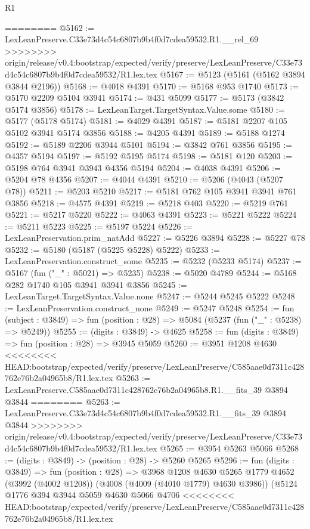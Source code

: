 \begin{lexlean}{R1}
\begin{coremodule}
{{{{{{{{{{{{{{{{{{{{{{{{{{{{{{{{{{{{{{{{{{{{{{{{{{{{{{{{{{{{{{{{{{{{{{{{{{{{{{{{{{{{{{{{{{{{{{{{{{{{{{{{{{{{{{{{{{{{{{{{{{{{{{{{{{{{{{{{{{{{{{{{{{{{{{{{{{{{{{{{{{{{{{{{{{{{{{{{{{{{{{{{{{========
@5162 := LexLeanPreserve.C33e73d4c54c6807b9b4f0d7cdea59532.R1.__rel_69
>>>>>>>> origin/release/v0.4:bootstrap/expected/verify/preserve/LexLeanPreserve/C33e73d4c54c6807b9b4f0d7cdea59532/R1.lex.tex
@5167 := @5123 (@5161 (@5162 @3894 @3844 @2196))
@5168 := @4018 @4391
@5170 := @5168 @953 @1740
@5173 := @5170 @2209 @5104 @3941
@5174 := @431 @5099
@5177 := @5173 (@3842 @5174 @3856)
@5178 := LexLeanTarget.TargetSyntax.Value.some
@5180 := @5177 (@5178 @5174)
@5181 := @4029 @4391
@5187 := @5181 @2207 @105 @5102 @3941 @5174 @3856
@5188 := @4205 @4391
@5189 := @5188 @1274
@5192 := @5189 @2206 @3944 @5101
@5194 := @3842 @761 @3856
@5195 := @4357 @5194
@5197 := @5192 @5195 @5174
@5198 := @5181 @120
@5203 := @5198 @764 @3941 @3943 @4356 @5194
@5204 := @4038 @4391
@5206 := @5204 @78 @4356
@5207 := @4044 @4391
@5210 := @5206 (@4043 (@5207 @78))
@5211 := @5203 @5210
@5217 := @5181 @762 @105 @3941 @3941 @761 @3856
@5218 := @4575 @4391
@5219 := @5218 @403
@5220 := @5219 @761
@5221 := @5217 @5220
@5222 := @4063 @4391
@5223 := @5221 @5222
@5224 := @5211 @5223
@5225 := @5197 @5224
@5226 := LexLeanPreservation.prim_natAdd
@5227 := @5226 @3894
@5228 := @5227 @78
@5232 := @5180 (@5187 (@5225 @5228) @5222)
@5233 := LexLeanPreservation.construct_some
@5235 := @5232 (@5233 @5174)
@5237 := @5167 (fun ("_" : @5021) => @5235)
@5238 := @5020 @4789
@5244 := @5168 @282 @1740 @105 @3941 @3941 @3856
@5245 := LexLeanTarget.TargetSyntax.Value.none
@5247 := @5244 @5245 @5222
@5248 := LexLeanPreservation.construct_none
@5249 := @5247 @5248
@5254 := fun (subject : @3849) => fun (position : @28) => @5084 (@5237 (fun ("_" : @5238) => @5249))
@5255 := (digits : @3849) -> @4625
@5258 := fun (digits : @3849) => fun (position : @28) => @3945 @5059
@5260 := @3951 @1208 @4630
<<<<<<<< HEAD:bootstrap/expected/verify/preserve/LexLeanPreserve/C585aae0d7311c428762e76b2a04965b8/R1.lex.tex
@5263 := LexLeanPreserve.C585aae0d7311c428762e76b2a04965b8.R1.__fits_39 @3894 @3844
========
@5263 := LexLeanPreserve.C33e73d4c54c6807b9b4f0d7cdea59532.R1.__fits_39 @3894 @3844
>>>>>>>> origin/release/v0.4:bootstrap/expected/verify/preserve/LexLeanPreserve/C33e73d4c54c6807b9b4f0d7cdea59532/R1.lex.tex
@5265 := @3954 @5263 @5066
@5268 := (digits : @3849) -> (position : @28) -> @5260 @5265
@5296 := fun (digits : @3849) =>
  fun (position : @28) =>
  @3968
    @1208
    @4630
    @5265
    @1779
    @4652
    (@3992 (@4002 @1208))
    (@4008 (@4009 (@4010 @1779) @4630 @3986))
    (@5124
      @1776
      @394
      @3944
      @5059
      @4630
      @5066
      @4706
<<<<<<<< HEAD:bootstrap/expected/verify/preserve/LexLeanPreserve/C585aae0d7311c428762e76b2a04965b8/R1.lex.tex
}}}}}}}}}}}}}}}}}}}}}}}}}}}}}}}}}}}}}}}}}}}}}}}}}}}}}}}}}}}}}}}}}}}}}}}}}}}}}}}}}}}}}}}}}}}}}}}}}}}}}}}}}}}}}}}}}}}}}}}}}}}}}}}}}}}}}}}}}}}}}}}}}}}}}}}}}}}}}}}}}}}}}}}}}}}}}}}}}}}}}}}}}}
\end{coremodule}
\end{lexlean}
